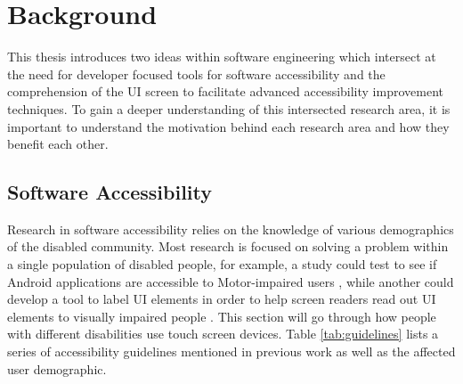 \section{Background}
\label{sec:background}

This thesis introduces two ideas within software engineering which intersect at the need for developer focused tools for software accessibility and the comprehension of the UI screen to facilitate advanced accessibility improvement techniques. To gain a deeper understanding of this intersected research area, it is important to understand the motivation behind each research area and how they benefit each other. 

\subsection{Software Accessibility}

Research in software accessibility relies on the knowledge of various demographics of the disabled community. Most research is focused on solving a problem within a single population of disabled people, for example, a study could test to see if Android applications are accessible to Motor-impaired users \cite{Alshayban20}, while another could develop a tool to label UI elements in order to help screen readers read out UI elements to visually impaired people \cite{Salehnamadi21}. This section will go through how people with different disabilities use touch screen devices. Table \ref{tab:guidelines} lists a series of accessibility guidelines mentioned in previous work as well as the affected user demographic.



